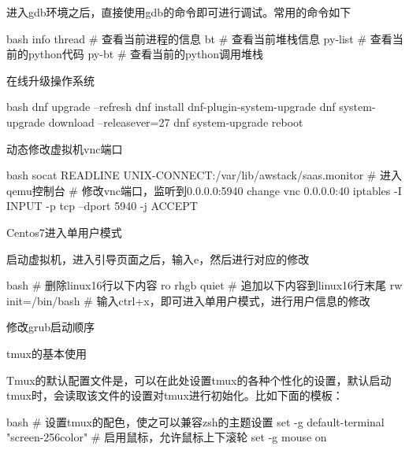 \begin{outline}[enumerate]
进入gdb环境之后，直接使用gdb的命令即可进行调试。常用的命令如下
\begin{code-block}{bash}
info thread # 查看当前进程的信息
bt          # 查看当前堆栈信息
py-list     # 查看当前的python代码
py-bt       # 查看当前的python调用堆栈
\end{code-block}

\1 在线升级操作系统

\begin{code-block}{bash}
dnf upgrade --refresh
dnf install dnf-plugin-system-upgrade
dnf system-upgrade download --releasever=27
dnf system-upgrade reboot
\end{code-block}

\1 动态修改虚拟机vnc端口

\begin{code-block}{bash}
socat READLINE UNIX-CONNECT:/var/lib/awstack/saas.monitor
# 进入qemu控制台
# 修改vnc端口，监听到0.0.0.0:5940
change vnc 0.0.0.0:40
iptables -I INPUT -p tcp --dport 5940 -j ACCEPT
\end{code-block}

\1 Centos7进入单用户模式

启动虚拟机，进入引导页面之后，输入e，然后进行对应的修改
\begin{code-block}{bash}
# 删除linux16行以下内容
ro rhgb quiet
# 追加以下内容到linux16行末尾
rw init=/bin/bash
# 输入ctrl+x，即可进入单用户模式，进行用户信息的修改
\end{code-block}

\1 修改grub启动顺序


\1 tmux的基本使用

Tmux的默认配置文件是，可以在此处设置tmux的各种个性化的设置，默认启动
tmux时，会读取该文件的设置对tmux进行初始化。比如下面的模板：
\begin{code-block}{bash}
# 设置tmux的配色，使之可以兼容zsh的主题设置
set -g default-terminal "screen-256color"
# 启用鼠标，允许鼠标上下滚轮
set -g mouse on
\end{code-block}


\end{outline}
